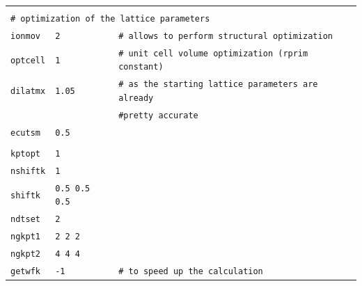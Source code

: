 \documentclass[11pt,a4paper]{article}
\begin{document}
\begin{center}
\begin{tabular}{lll}
&&\\
\multicolumn{3}{l}{\texttt{\# optimization of the lattice parameters}}\\
\texttt{ionmov} & \texttt{2} & \texttt{\# allows to perform structural optimization}\\
\texttt{optcell} & \texttt{1} & \texttt{\# unit cell volume optimization (rprim constant)}\\
\texttt{dilatmx} & \texttt{1.05} & \texttt{\# as the starting lattice parameters are already}\\
&&\texttt{\#\space\space\space\space  pretty accurate}\\
\texttt{ecutsm} & \texttt{0.5} &\\
\\
\texttt{kptopt} & \texttt{1} & \\
\texttt{nshiftk} & \texttt{1} & \\
\texttt{shiftk} & \texttt{0.5 0.5 0.5} &\\
\texttt{ndtset} & \texttt{2} & \\
\texttt{ngkpt1} & \texttt{2 2 2} & \\
\texttt{ngkpt2} & \texttt{4 4 4} & \\
\texttt{getwfk} & \texttt{-1} & \texttt{\# to speed up the calculation}\\
\end{tabular}
\end{center} 
\end{document}
